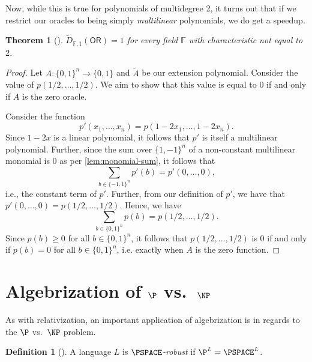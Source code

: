 \documentclass[english]{reedthesis}
\theoremstyle{plain}
\newtheorem{thm}{Theorem}[section]
\theoremstyle{definition}
\newtheorem{defn}[defn]{Definition}
\theoremstyle{remark}
\begin{document}
Now, while this is true for polynomials of multidegree 2, it turns out that if
we restrict our oracles to being simply \emph{multilinear} polynomials, we do
get a speedup.

\begin{thm}[{\cite[Thm. 3]{JKRS09}}]\label{thm:or-multilinear}
  $\tilde{D}_{\mathbb{F},1}(\mathsf{OR}) = 1$ for every field $\mathbb{F}$ with
  characteristic not equal to $2$.
\end{thm}

\begin{proof}
  Let $A: \{0, 1\}^{n} \rightarrow \{0, 1\}$ and $\tilde{A}$ be our extension polynomial.
  Consider the value of $p(1/2, \ldots, 1/2)$. We aim to show that this value is
  equal to $0$ if and only if $A$ is the zero oracle.

  Consider the function
  \begin{equation}
    p'(x_{1}, \ldots, x_{n}) = p(1 - 2x_{1}, \ldots, 1 - 2x_{n}).
  \end{equation}
  Since $1 - 2x$ is a linear polynomial, it follows that $p'$ is itself a
  multilinear polynomial. Further, since the sum over $\{1, -1\}^{n}$ of a
  non-constant multilinear monomial is 0 as per \cref{lem:monomial-sum}, it
  follows that
  \begin{equation}
    \sum_{b \in \{-1, 1\}^{n}}p'(b) = p'(0, \ldots, 0),
  \end{equation}
  i.e., the constant term of $p'$. Further, from our definition of $p'$, we have
  that $p'(0, \ldots, 0) = p(1/2, \ldots, 1/2)$. Hence, we have
  \begin{equation}
    \sum_{b \in \{0, 1\}^{n}}p(b) = p(1/2, \ldots, 1/2).
  \end{equation}
  Since $p(b) \ge 0$ for all $b \in \{0, 1\}^{n}$, it follows that $p(1/2, \ldots, 1/2)$
  is 0 if and only if $p(b) = 0$ for all $b \in \{0, 1\}^{n}$, i.e. exactly when
  $A$ is the zero function.
\end{proof}


\section{Algebrization of $\P$ vs.\ $\NP$}\label{sec:alg-p-np}

As with relativization, an important application of algebrization is in regards
to the $\P$ vs.\ $\NP$ problem.

\begin{defn}[{\cite[Def.\ 6.1]{BFL90}}]\label{def:pspace-robust}
  A language $L$ is \emph{$\PSPACE$-robust} if $\P^{L} = \PSPACE^{L}$.
\end{defn}
\end{document}
